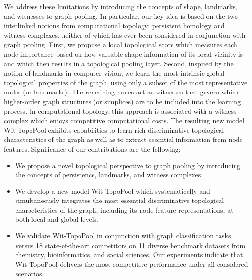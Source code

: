 \documentclass[letterpaper]{article} %
\begin{document}
We address these limitations by introducing the concepts of shape, landmarks, and witnesses  to graph pooling. In particular, our key idea is based on the two interlinked notions from computational topology: persistent homology and witness complexes, neither of which has ever been considered in conjunction with graph pooling. First, we propose a local topological score which measures each node importance based on how valuable shape information of its local vicinity is and which then results in a topological pooling layer. Second, inspired by the notion of landmarks in computer vision, we learn the most intrinsic global topological properties of the graph, using only a subset of the most representative nodes (or landmarks).
The remaining nodes act as witnesses that govern which higher-order graph structures (or simplices) are to be included into the learning process. In computational topology, this approach is associated with a witness complex which enjoys competitive computational costs. The resulting new model Wit-TopoPool exhibits capabilities to learn rich discriminative topological characteristics of the graph as well as to extract essential information from node features. Significance of our contributions are the following:
\begin{itemize}[leftmargin=*]
\item We propose a novel topological perspective to graph pooling by introducing the concepts of persistence, landmarks, and witness complexes.

\item We develop a new model Wit-TopoPool which systematically and simultaneously integrates the most essential discriminative topological characteristics of the graph, including its node feature representations, at both local and global levels.

\item We validate Wit-TopoPool in conjunction with graph classification tasks versus 18 state-of-the-art competitors on 11 diverse benchmark datasets from chemistry, bioinformatics, and social sciences.
Our experiments indicate that Wit-TopoPool delivers the most competitive performance under all considered scenarios.

\end{itemize}



\end{document}
